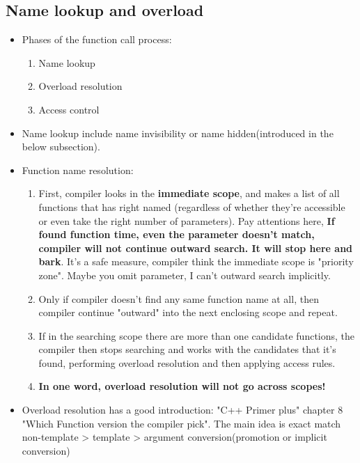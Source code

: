 \documentclass[a4paper,12pt,twoside]{book}
\begin{document}
\subsection{Name lookup and overload}
\begin{itemize}

\item Phases of the function call process:
\begin{enumerate}
\item Name lookup 
\item Overload resolution 
\item Access control
\end{enumerate}

\item Name lookup include name invisibility or name hidden(introduced in the below subsection).

\item Function name resolution:
\begin{enumerate}
	\item First, compiler looks in the \textbf{immediate scope},  and makes a list of all functions that has right named  (regardless of whether they're accessible or even take the right number of parameters). Pay attentions here, \textbf{If found function time, even the parameter doesn't match, compiler will not continue outward search. It will stop here and bark}. It's a safe measure, compiler think the immediate scope is "priority zone". Maybe you omit parameter, I can't outward search implicitly. 
	
	\item Only if compiler doesn't find any same function name at all, then compiler continue "outward" into the next enclosing scope and repeat.
	
	\item If in the searching scope there are more than one candidate functions, the compiler then stops searching and works with the candidates that it's found, performing overload resolution and then applying access rules.
	
	\item \textbf{In one word, overload resolution will not go across scopes!}
\end{enumerate}

\item Overload resolution has a good introduction: "C++ Primer plus" chapter 8 "Which Function version the compiler pick". The main idea is exact match non-template > template > argument conversion(promotion or implicit conversion)

\end{itemize}
\end{document}
